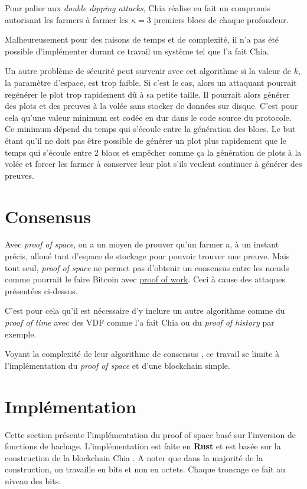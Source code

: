 Pour palier aux \emph{double dipping attacks}, Chia réalise en fait un compromis autorisant les farmers à farmer les $\kappa = 3$ premiers blocs de chaque profondeur.

Malheureusement pour des raisons de temps et de complexité, il n'a pas été possible d'implémenter durant ce travail un système tel que l'a fait Chia.

Un autre problème de sécurité peut survenir avec cet algorithme si la valeur de $k$, la paramètre d'espace, est trop faible. Si c'est le cas, alors un attaquant pourrait regénérer le plot trop rapidement dû à sa petite taille. Il pourrait alors générer des plots et des preuves à la volée sans stocker de données sur disque. C'est pour cela qu'une valeur minimum est codée en dur dans le code source du protocole. Ce minimum dépend du temps qui s'écoule entre la génération des blocs. Le but étant qu'il ne doit pas être possible de générer un plot plus rapidement que le temps qui s'écoule entre 2 blocs et empêcher comme ça la génération de plots à la volée et forcer les farmer à conserver leur plot s'ils veulent continuer à générer des preuves.

\section{Consensus}

Avec \emph{proof of space}, on a un moyen de prouver qu'un farmer a, à un instant précis, alloué tant d'espace de stockage pour pouvoir trouver une preuve. Mais tout seul, \emph{proof of space} ne permet pas d'obtenir un consensus entre les nœuds comme pourrait le faire Bitcoin avec \hyperref[consensus:pow]{proof of work}. Ceci à cause des attaques présentées ci-dessus.

C'est pour cela qu'il est nécessaire d'y inclure un autre algorithme comme du \emph{proof of time} avec des VDF comme l'a fait Chia ou du \emph{proof of history} par exemple.

Voyant la complexité de leur algorithme de consensus \cite{chia:consensus}, ce travail se limite à l'implémentation du \emph{proof of space} et d'une blockchain simple.

\section{Implémentation}

Cette section présente l'implémentation du proof of space basé sur l'inversion de fonctions de hachage. L'implémentation est faite en \textbf{Rust} et est basée sur la construction de la blockchain Chia \cite{chia:construction}. A noter que dans la majorité de la construction, on travaille en bits et non en octets. Chaque troncage ce fait au niveau des bits.

